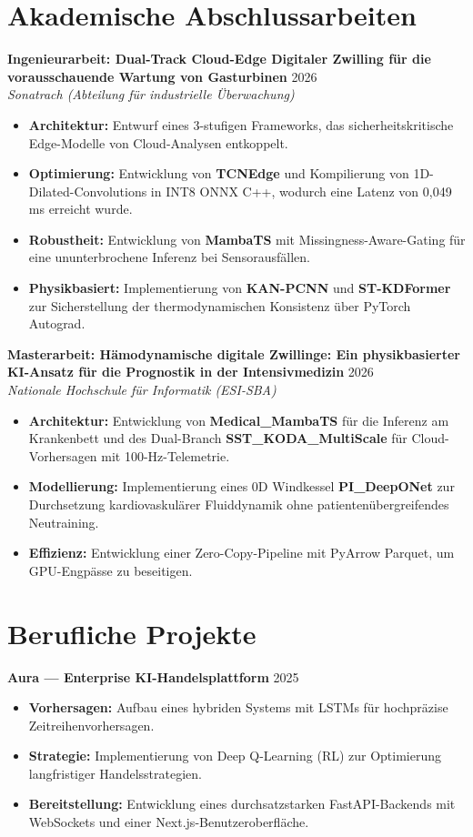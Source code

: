 \documentclass[a4paper,10pt]{article}
\begin{document}
\section{Akademische Abschlussarbeiten}
\noindent\textbf{Ingenieurarbeit: Dual-Track Cloud-Edge Digitaler Zwilling für die vorausschauende Wartung von Gasturbinen} \hfill 2026 \\
\textit{Sonatrach (Abteilung für industrielle Überwachung)}
\begin{itemize}
    \item \textbf{Architektur:} Entwurf eines 3-stufigen Frameworks, das sicherheitskritische Edge-Modelle von Cloud-Analysen entkoppelt.
    \item \textbf{Optimierung:} Entwicklung von \textbf{TCNEdge} und Kompilierung von 1D-Dilated-Convolutions in INT8 ONNX C++, wodurch eine Latenz von 0,049 ms erreicht wurde.
    \item \textbf{Robustheit:} Entwicklung von \textbf{MambaTS} mit Missingness-Aware-Gating für eine ununterbrochene Inferenz bei Sensorausfällen.
    \item \textbf{Physikbasiert:} Implementierung von \textbf{KAN-PCNN} und \textbf{ST-KDFormer} zur Sicherstellung der thermodynamischen Konsistenz über PyTorch Autograd.
\end{itemize}

\noindent\textbf{Masterarbeit: Hämodynamische digitale Zwillinge: Ein physikbasierter KI-Ansatz für die Prognostik in der Intensivmedizin} \hfill 2026 \\
\textit{Nationale Hochschule für Informatik (ESI-SBA)}
\begin{itemize}
    \item \textbf{Architektur:} Entwicklung von \textbf{Medical\_MambaTS} für die Inferenz am Krankenbett und des Dual-Branch \textbf{SST\_KODA\_MultiScale} für Cloud-Vorhersagen mit 100-Hz-Telemetrie.
    \item \textbf{Modellierung:} Implementierung eines 0D Windkessel \textbf{PI\_DeepONet} zur Durchsetzung kardiovaskulärer Fluiddynamik ohne patientenübergreifendes Neutraining.
    \item \textbf{Effizienz:} Entwicklung einer Zero-Copy-Pipeline mit PyArrow Parquet, um GPU-Engpässe zu beseitigen.
\end{itemize}

\section{Berufliche Projekte}
\noindent\textbf{Aura --- Enterprise KI-Handelsplattform} \hfill 2025 \\
\begin{itemize}
    \item \textbf{Vorhersagen:} Aufbau eines hybriden Systems mit LSTMs für hochpräzise Zeitreihenvorhersagen.
    \item \textbf{Strategie:} Implementierung von Deep Q-Learning (RL) zur Optimierung langfristiger Handelsstrategien.
    \item \textbf{Bereitstellung:} Entwicklung eines durchsatzstarken FastAPI-Backends mit WebSockets und einer Next.js-Benutzeroberfläche.
\end{itemize}
\end{document}
